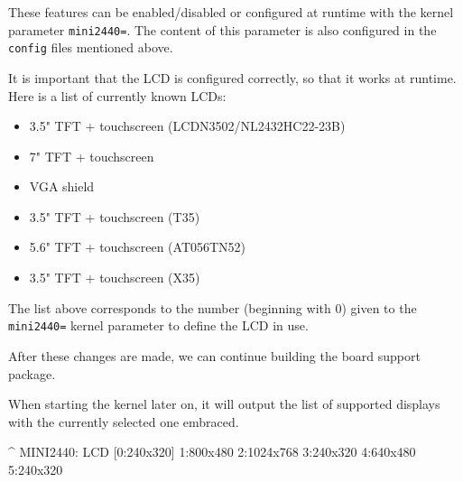 These features can be enabled/disabled or configured at runtime with the kernel
parameter \texttt{mini2440=}. The content of this parameter is also configured
in the \texttt{config} files mentioned above.

It is important that the LCD is configured correctly, so that it works at
runtime. Here is a list of currently known LCDs:

\begin{itemize}
 \item 3.5" TFT + touchscreen (LCDN3502/NL2432HC22-23B)
 \item 7" TFT + touchscreen
 \item VGA shield
 \item 3.5" TFT + touchscreen (T35)
 \item 5.6" TFT + touchscreen (AT056TN52)
 \item 3.5" TFT + touchscreen (X35)
\end{itemize}

The list above corresponds to the number (beginning with 0) given to the
\texttt{mini2440=} kernel parameter to define the LCD in use.

After these changes are made, we can continue building the board support package.

When starting the kernel later on, it will output the list of supported displays
with the currently selected one embraced.

\begin{ptxshell}[escapechar=|]{^}
MINI2440: LCD [0:240x320] 1:800x480 2:1024x768 3:240x320 4:640x480 5:240x320
\end{ptxshell}
